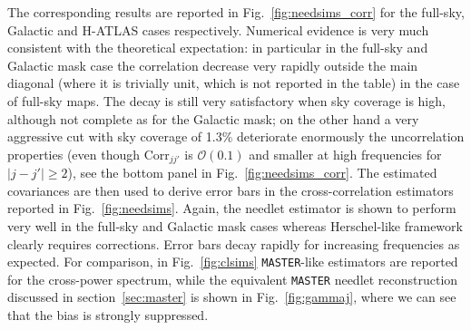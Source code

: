 The corresponding results are reported in Fig.~\eqref{fig:needsims_corr} for the full-sky, Galactic and H-ATLAS cases respectively. Numerical evidence is very much consistent with the theoretical expectation: in particular in the full-sky and Galactic mask case the correlation decrease very rapidly outside the main diagonal (where it is trivially unit, which is not reported in the table) in the case of full-sky maps. The decay is still very satisfactory when sky coverage is high, although not complete as for the Galactic mask; on the other hand a very aggressive cut with sky coverage of 1.3\% deteriorate enormously the uncorrelation properties (even though Corr$_{jj'}$ is $\mathcal{O}(0.1)$ and smaller at high frequencies for $|j-j'|\ge2$), see the bottom panel in Fig.~\eqref{fig:needsims_corr}. The estimated covariances are then used to derive error bars in the cross-correlation estimators reported in Fig.~\eqref{fig:needsims}. Again, the needlet estimator is shown to perform very well in the full-sky and Galactic mask cases whereas Herschel-like framework clearly requires corrections. Error bars decay rapidly for increasing frequencies as expected.
For comparison, in Fig.~\eqref{fig:clsims} \texttt{MASTER}-like estimators are reported for the cross-power spectrum, while the equivalent \texttt{MASTER} needlet reconstruction discussed in section~\eqref{sec:master}  is shown in Fig.~\eqref{fig:gammaj}, where we can see that the bias is strongly suppressed. 
